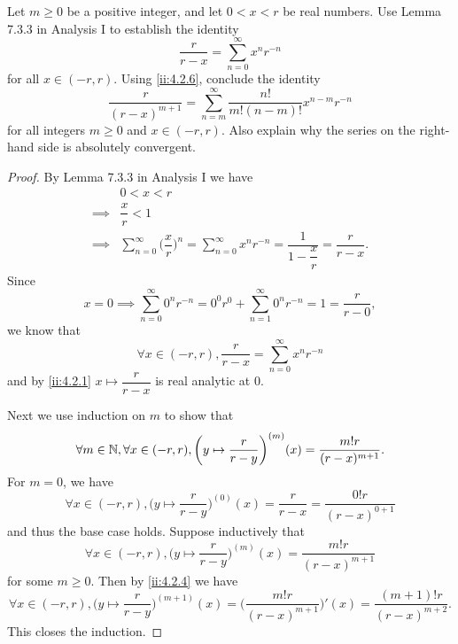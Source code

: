 \begin{ex}\label{ii:ex:4.2.7}
  Let \(m \geq 0\) be a positive integer, and let \(0 < x < r\) be real numbers.
  Use Lemma 7.3.3 in Analysis I to establish the identity
  \[
    \dfrac{r}{r - x} = \sum_{n = 0}^\infty x^n r^{-n}
  \]
  for all \(x \in (-r, r)\).
  Using \cref{ii:4.2.6}, conclude the identity
  \[
    \dfrac{r}{(r - x)^{m + 1}} = \sum_{n = m}^\infty \dfrac{n!}{m! (n - m)!} x^{n - m} r^{-n}
  \]
  for all integers \(m \geq 0\) and \(x \in (-r, r)\).
  Also explain why the series on the right-hand side is absolutely convergent.
\end{ex}

\begin{proof}
  By Lemma 7.3.3 in Analysis I we have
  \begin{align*}
             & 0 < x < r                                                                                                                         \\
    \implies & \dfrac{x}{r} < 1                                                                                                                  \\
    \implies & \sum_{n = 0}^\infty \bigg(\dfrac{x}{r}\bigg)^n = \sum_{n = 0}^\infty x^n r^{-n} = \dfrac{1}{1 - \dfrac{x}{r}} = \dfrac{r}{r - x}.
  \end{align*}
  Since
  \[
    x = 0 \implies \sum_{n = 0}^\infty 0^n r^{-n} = 0^0 r^{0} + \sum_{n = 1}^\infty 0^n r^{-n} = 1 = \dfrac{r}{r - 0},
  \]
  we know that
  \[
    \forall x \in (-r, r), \dfrac{r}{r - x} = \sum_{n = 0}^\infty x^n r^{-n}
  \]
  and by \cref{ii:4.2.1} \(x \mapsto \dfrac{r}{r - x}\) is real analytic at \(0\).

  Next we use induction on \(m\) to show that
  \[
    \forall m \in \mathbb{N}, \forall x \in (-r, r), \bigg(y \mapsto \dfrac{r}{r - y}\bigg)^{(m)}(x) = \dfrac{m! r}{(r - x)^{m + 1}}.
  \]
  For \(m = 0\), we have
  \[
    \forall x \in (-r, r), \bigg(y \mapsto \dfrac{r}{r - y}\bigg)^{(0)}(x) = \dfrac{r}{r - x} = \dfrac{0! r}{(r - x)^{0 + 1}}
  \]
  and thus the base case holds.
  Suppose inductively that
  \[
    \forall x \in (-r, r), \bigg(y \mapsto \dfrac{r}{r - y}\bigg)^{(m)}(x) = \dfrac{m! r}{(r - x)^{m + 1}}
  \]
  for some \(m \geq 0\).
  Then by \cref{ii:4.2.4} we have
  \[
    \forall x \in (-r, r), \bigg(y \mapsto \dfrac{r}{r - y}\bigg)^{(m + 1)}(x) = \bigg(\dfrac{m! r}{(r - x)^{m + 1}}\bigg)'(x) = \dfrac{(m + 1)! r}{(r - x)^{m + 2}}.
  \]
  This closes the induction.


\end{proof}
